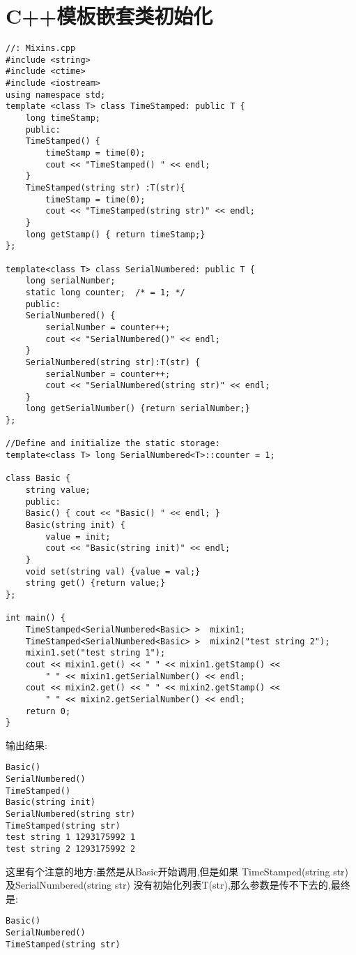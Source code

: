 \documentclass[a4paper,11pt]{book}
\begin{document}
\section{C++模板嵌套类初始化}
\begin{lstlisting}
//: Mixins.cpp
#include <string>
#include <ctime>
#include <iostream>
using namespace std;
template <class T> class TimeStamped: public T {
    long timeStamp;
    public:
    TimeStamped() { 
        timeStamp = time(0);
        cout << "TimeStamped() " << endl;
    }
    TimeStamped(string str) :T(str){ 
        timeStamp = time(0);
        cout << "TimeStamped(string str)" << endl;
    }
    long getStamp() { return timeStamp;}
};

template<class T> class SerialNumbered: public T {
    long serialNumber;
    static long counter;  /* = 1; */
    public:
    SerialNumbered() {
        serialNumber = counter++;
        cout << "SerialNumbered()" << endl;
    }
    SerialNumbered(string str):T(str) { 
        serialNumber = counter++;
        cout << "SerialNumbered(string str)" << endl;
    }
    long getSerialNumber() {return serialNumber;}
};

//Define and initialize the static storage:
template<class T> long SerialNumbered<T>::counter = 1;

class Basic {
    string value;
    public:
    Basic() { cout << "Basic() " << endl; }
    Basic(string init) {
        value = init;
        cout << "Basic(string init)" << endl;
    }
    void set(string val) {value = val;}
    string get() {return value;}
};

int main() {
    TimeStamped<SerialNumbered<Basic> >  mixin1;
    TimeStamped<SerialNumbered<Basic> >  mixin2("test string 2");
    mixin1.set("test string 1");
    cout << mixin1.get() << " " << mixin1.getStamp() <<
        " " << mixin1.getSerialNumber() << endl;
    cout << mixin2.get() << " " << mixin2.getStamp() <<
        " " << mixin2.getSerialNumber() << endl;
    return 0;
}

\end{lstlisting}
输出结果:
\begin{verbatim}
Basic()
SerialNumbered()
TimeStamped()
Basic(string init)
SerialNumbered(string str)
TimeStamped(string str)
test string 1 1293175992 1
test string 2 1293175992 2
\end{verbatim}

这里有个注意的地方:虽然是从Basic开始调用,但是如果
TimeStamped(string str)及SerialNumbered(string str)
没有初始化列表T(str),那么参数是传不下去的,最终是:
\begin{verbatim}
Basic()
SerialNumbered()
TimeStamped(string str)
\end{verbatim}
\end{document}
